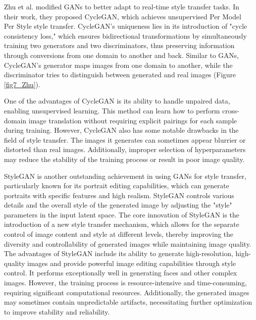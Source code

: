 Zhu et al.\citep{37zhu2017unpaired} modified GANs\citep{38goodfellow2014generative} to better adapt to real-time style transfer tasks. In their work\citep{37zhu2017unpaired}, they proposed CycleGAN, which achieves unsupervised Per Model Per Style style transfer. CycleGAN's uniqueness lies in its introduction of "cycle consistency loss," which ensures bidirectional transformations by simultaneously training two generators and two discriminators, thus preserving information through conversions from one domain to another and back. Similar to GANs, CycleGAN\citep{37zhu2017unpaired}'s generator maps images from one domain to another, while the discriminator tries to distinguish between generated and real images (Figure \ref{fig7_Zhu}).



One of the advantages of CycleGAN is its ability to handle unpaired data, enabling unsupervised learning. This method can learn how to perform cross-domain image translation without requiring explicit pairings for each sample during training. However, CycleGAN also has some notable drawbacks in the field of style transfer. The images it generates can sometimes appear blurrier or distorted than real images. Additionally, improper selection of hyperparameters may reduce the stability of the training process or result in poor image quality.

StyleGAN\citep{19karras2019style} is another outstanding achievement in using GANs for style transfer, particularly known for its portrait editing capabilities, which can generate portraits with specific features and high realism. StyleGAN controls various details and the overall style of the generated image by adjusting the "style" parameters in the input latent space. The core innovation of StyleGAN is the introduction of a new style transfer mechanism, which allows for the separate control of image content and style at different levels, thereby improving the diversity and controllability of generated images while maintaining image quality. The advantages of StyleGAN include its ability to generate high-resolution, high-quality images and provide powerful image editing capabilities through style control. It performs exceptionally well in generating faces and other complex images. However, the training process is resource-intensive and time-consuming, requiring significant computational resources. Additionally, the generated images may sometimes contain unpredictable artifacts, necessitating further optimization to improve stability and reliability.

